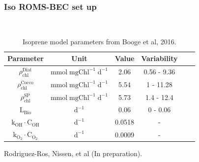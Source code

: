 \documentclass{beamer}
\begin{document}
\begin{frame}
\frametitle{Iso ROMS-BEC set up}

\begin{center}


\begin{table}[h!]
\centering
{} \\

\bigskip
\caption{Isoprene model parameters from Booge et al, 2016.}

\begin{tabular}[ht]{ c|c|c|c|c|c } 

 \textbf{Parameter} & \textbf{Unit} &  \textbf{Value} & \textbf{Variability} \\\hline

 $\rho^{\mathrm{Diat}}_{\mathrm{chl}}$     & $\mathrm{mmol} \; \mathrm{mgChl}^{\mathrm{-1}} \; \mathrm{d}^{\mathrm{-1}}$  & 2.06 & 0.56 - 9.36 \\

$\rho^{\mathrm{Cocco}}_{\mathrm{chl}}$     & $\mathrm{mmol} \; \mathrm{mgChl}^{\mathrm{-1}} \; \mathrm{d}^{\mathrm{-1}}$  & 5.54 & 1 - 11.28 \\

$\rho^{\mathrm{SP}}_{\mathrm{chl}}$     & $\mathrm{mmol} \; \mathrm{mgChl}^{\mathrm{-1}} \; \mathrm{d}^{\mathrm{-1}}$  & 5.73 & 1.4 - 12.4\\

$\mathrm{L}_{\mathrm{Bio}}$ & $\mathrm{d}^{\mathrm{-1}}$ & 0.06 & 0 - 0.06 \\

$\mathrm{k}_{\mathrm{OH}} \cdot \mathrm{C}_{\mathrm{OH}}$ & $\mathrm{d}^{\mathrm{-1}}$ & 0.0518 & - \\

$\mathrm{k}_{\mathrm{O_{\mathrm{2}}}} \cdot \mathrm{C}_{\mathrm{O_{\mathrm{2}}}}$ & $\mathrm{d}^{\mathrm{-1}}$  & 0.0009 & -  \\

\end{tabular}

\end{table}

\end{center}
\tiny  Rodriguez-Ros, Nissen, et al (In preparation).

\end{frame}
\end{document}
